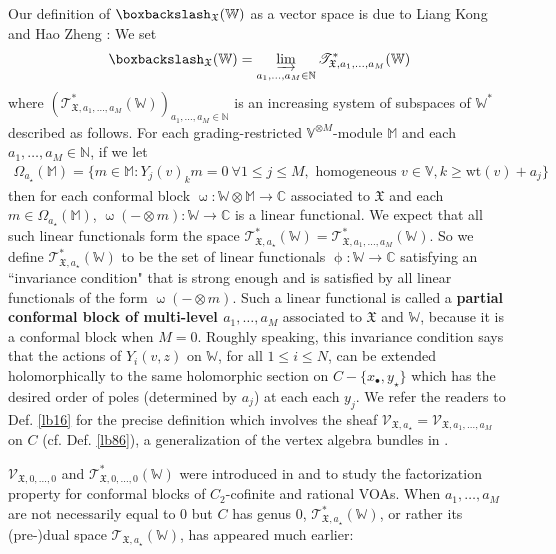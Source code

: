 \documentclass[11pt,b5paper,notitlepage]{article}
\theoremstyle{definition}
\theoremstyle{plain}
\newcommand{\fk}{\mathfrak}
\newcommand{\scr}{\mathscr}
\newcommand{\blt}{\bullet}
\newcommand{\Vbb}{\mathbb V}
\newcommand{\Wbb}{\mathbb W}
\newcommand{\Mbb}{\mathbb M}
\newcommand{\Cbb}{\mathbb C}
\newcommand{\Nbb}{\mathbb N}
\newcommand{\wt}{\mathrm{wt}}
\newcommand{\<}{\left\langle}
\renewcommand{\>}{\right\rangle}
\newcommand{\fx}{\mathfrak{X}}
\newcommand{\bbs}{\boxbackslash}
\numberwithin{equation}{subsection}
\begin{document}
Our definition of $\bbs_\fx(\Wbb)$ as a vector space is due to Liang Kong and Hao Zheng \cite{KZ-conformal-block}: We set
\begin{align*}
\bbs_\fx(\Wbb)=\varinjlim_{a_1,\dots,a_M\in\Nbb}\scr T_{\fx,a_1,\dots,a_M}^*(\Wbb)
\end{align*}
where $(\scr T_{\fx,a_1,\dots,a_M}^*(\Wbb))_{a_1,\dots,a_M\in\Nbb}$ is an increasing system of subspaces of $\Wbb^*$ described as follows. For each grading-restricted $\Vbb^{\otimes M}$-module $\Mbb$ and each $a_1,\dots,a_M\in\Nbb$, if we let
\begin{align*}
\Omega_{a_\star}(\Mbb)=\{m\in \Mbb:Y_j(v)_km=0~\forall 1\leq j\leq M,\text{ homogeneous }v\in\Vbb,k\geq\wt(v)+a_j\}
\end{align*}
then for each conformal block $\upomega:\Wbb\otimes\Mbb\rightarrow\Cbb$ associated to $\fx$ and each $m\in\Omega_{a_\star}(\Mbb)$, $\upomega(-\otimes m):\Wbb\rightarrow\Cbb$ is a linear functional. We expect that all such linear functionals form the space $\scr T_{\fx,a_\star}^*(\Wbb)=\scr T_{\fx,a_1,\dots,a_M}^*(\Wbb)$. So we define $\scr T_{\fx,a_\star}^*(\Wbb)$ to be the set of linear functionals $\upphi:\Wbb\rightarrow\Cbb$ satisfying an ``invariance condition" that is strong enough and is satisfied by all linear functionals of the form $\upomega(-\otimes m)$. Such a linear functional is called a \textbf{partial conformal block of multi-level $a_1,\dots,a_M$} associated to $\fk X$ and $\Wbb$, because it is a conformal block when $M=0$. Roughly speaking, this invariance condition says that the actions of $Y_i(v,z)$ on $\Wbb$, for all $1\leq i\leq N$, can be extended holomorphically to the same holomorphic section on $C-\{x_\blt,y_\star\}$ which has the desired order of poles (determined by $a_j$) at each each $y_j$. We refer the readers to Def. \ref{lb16} for the precise definition which involves the sheaf $\scr V_{\fx,a_\star}=\scr V_{\fx,a_1,\dots,a_M}$ on $C$ (cf. Def. \ref{lb86}), a generalization of the vertex algebra bundles in \cite[Ch. 6]{FB04}. 

$\scr V_{\fx,0,\dots,0}$ and $\scr T_{\fx,0,\dots,0}^*(\Wbb)$ were introduced in \cite[Sec. 7.2]{NT-P1_conformal_blocks} and \cite[Sec. 6.2]{DGT2} to study the factorization property for conformal blocks of $C_2$-cofinite and rational VOAs. When $a_1,\dots,a_M$ are not necessarily equal to $0$ but $C$ has genus $0$, $\scr T_{\fx,a_\star}^*(\Wbb)$, or rather its (pre-)dual space $\scr T_{\fx,a_\star}(\Wbb)$, has appeared much earlier:
\end{document}
